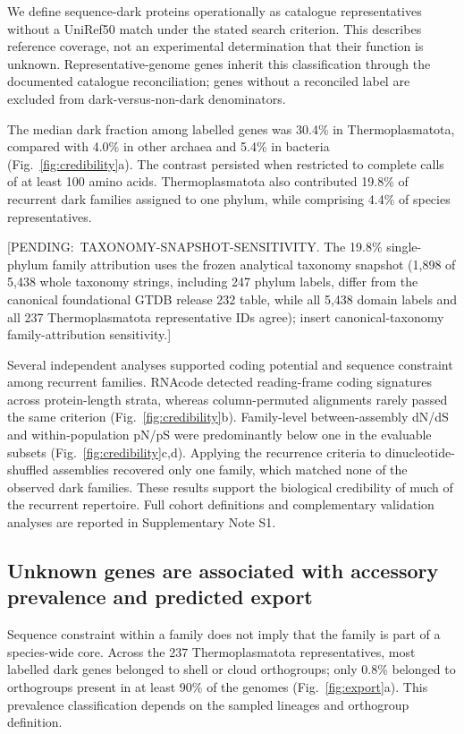 \documentclass[11pt]{article}
\begin{document}
We define sequence-dark proteins operationally as catalogue representatives without a UniRef50 match under the stated search criterion. This describes reference coverage, not an experimental determination that their function is unknown. Representative-genome genes inherit this classification through the documented catalogue reconciliation; genes without a reconciled label are excluded from dark-versus-non-dark denominators.

The median dark fraction among labelled genes was 30.4\% in Thermoplasmatota, compared with 4.0\% in other archaea and 5.4\% in bacteria (Fig.~\ref{fig:credibility}a). The contrast persisted when restricted to complete calls of at least 100 amino acids. Thermoplasmatota also contributed 19.8\% of recurrent dark families assigned to one phylum, while comprising 4.4\% of species representatives.

{\ttfamily\raggedright [PENDING:\allowbreak\ TAXONOMY-SNAPSHOT-SENSITIVITY. The 19.8\% single-phylum family attribution uses the frozen analytical taxonomy snapshot (1,898 of 5,438 whole taxonomy strings, including 247 phylum labels, differ from the canonical foundational GTDB release 232 table, while all 5,438 domain labels and all 237 Thermoplasmatota representative IDs agree); insert canonical-taxonomy family-attribution sensitivity.]\par}

Several independent analyses supported coding potential and sequence constraint among recurrent families. RNAcode detected reading-frame coding signatures across protein-length strata, whereas column-permuted alignments rarely passed the same criterion (Fig.~\ref{fig:credibility}b). Family-level between-assembly dN/dS and within-population pN/pS were predominantly below one in the evaluable subsets (Fig.~\ref{fig:credibility}c,d). Applying the recurrence criteria to dinucleotide-shuffled assemblies recovered only one family, which matched none of the observed dark families. These results support the biological credibility of much of the recurrent repertoire. Full cohort definitions and complementary validation analyses are reported in Supplementary Note S1.

\subsection*{Unknown genes are associated with accessory prevalence and predicted export}

Sequence constraint within a family does not imply that the family is part of a species-wide core. Across the 237 Thermoplasmatota representatives, most labelled dark genes belonged to shell or cloud orthogroups; only 0.8\% belonged to orthogroups present in at least 90\% of the genomes (Fig.~\ref{fig:export}a). This prevalence classification depends on the sampled lineages and orthogroup definition.
\end{document}
